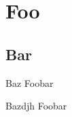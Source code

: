 \documentclass{beamer}
\begin{document}
\section{Foo}
\subsection{Bar}

\begin{frame}{Baz}
  Foobar
\end{frame}

\begin{frame}{Baz}{djh}
    Foobar
\end{frame}
\end{document}
